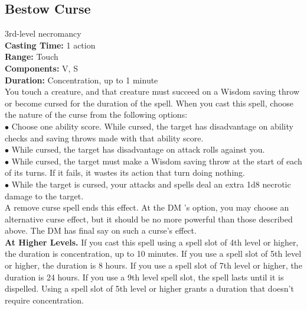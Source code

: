 \documentclass[11pt, A4paper, english]{article}
\begin{document}
		\subsection{Bestow Curse}
3rd-level necromancy \\
\textbf{Casting Time:} 1 action \\
\textbf{Range:} Touch \\
\textbf{Components:} V, S \\
\textbf{Duration:} Concentration, up to 1 minute \\
You touch a creature, and that creature must succeed on a Wisdom saving throw or become cursed for the duration of the spell. When you cast this spell, choose the nature of the curse from the following options: \\
\indent $\bullet$ Choose one ability score. While cursed, the target has disadvantage on ability checks and saving throws made with that ability score. \\
\indent $\bullet$ While cursed, the target has disadvantage on attack rolls against you. \\
\indent $\bullet$ While cursed, the target must make a Wisdom saving throw at the start of each of its turns. If it fails, it wastes its action that turn doing nothing. \\
\indent $\bullet$ While the target is cursed, your attacks and spells deal an extra 1d8 necrotic damage to the target. \\
A remove curse spell ends this effect. At the DM ’s option, you may choose an alternative curse effect, but it should be no more powerful than those described above. The DM has final say on such a curse’s effect. \\
\textbf{At Higher Levels.} If you cast this spell using a spell slot of 4th level or higher, the duration is concentration, up to 10 minutes. If you use a spell slot of 5th level or higher, the duration is 8 hours. If you use a spell slot of 7th level or higher, the duration is 24 hours. If you use a 9th level spell slot, the spell lasts until it is dispelled. Using a spell slot of 5th level or higher grants a duration that doesn't require concentration.
\end{document}
